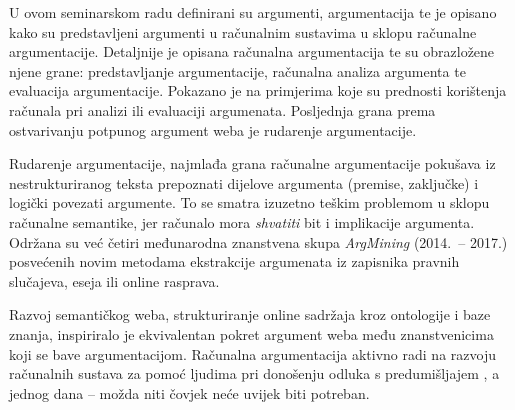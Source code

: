 U ovom seminarskom radu definirani su argumenti, argumentacija 
te je opisano kako su predstavljeni
argumenti u računalnim sustavima u sklopu računalne argumentacije. 
Detaljnije je opisana računalna argumentacija te su obrazložene 
njene grane: predstavljanje argumentacije, računalna analiza argumenta 
te evaluacija argumentacije. Pokazano je na primjerima
koje su prednosti korištenja računala pri analizi 
ili evaluaciji argumenata.  
Posljednja grana prema ostvarivanju potpunog 
argument weba je rudarenje argumentacije. 

Rudarenje argumentacije, najmlađa grana računalne argumentacije 
pokušava iz nestrukturiranog teksta
prepoznati dijelove argumenta (premise, zaključke)
i logički povezati argumente. To se 
smatra izuzetno teškim problemom 
u sklopu računalne semantike, jer računalo 
mora \emph{shvatiti} bit i implikacije argumenta. 
Održana su već četiri međunarodna  znanstvena 
skupa \emph{ArgMining} (2014.\ -- 2017.) posvećenih novim metodama
ekstrakcije argumenata iz zapisnika pravnih slučajeva,
eseja ili online rasprava.

Razvoj semantičkog weba, strukturiranje 
online sadržaja kroz ontologije i baze znanja, 
inspiriralo je ekvivalentan pokret 
argument weba među
znanstvenicima koji se bave argumentacijom.
Računalna argumentacija 
aktivno radi na razvoju računalnih sustava
za pomoć ljudima pri 
donošenju odluka s predumišljajem ,
a jednog dana --
možda niti čovjek neće uvijek biti potreban.

 
 
